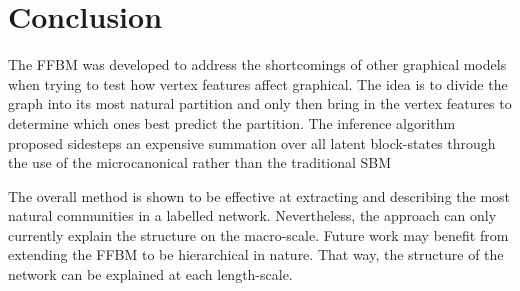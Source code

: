 \section{Conclusion}

The FFBM was developed to address the shortcomings of other graphical models when trying to test how vertex features affect graphical. The idea is to divide the graph into its most natural partition and only then bring in the vertex features to determine which ones best predict the partition. The inference algorithm proposed sidesteps an expensive summation over all latent block-states through the use of the microcanonical rather than the traditional SBM

The overall method is shown to be effective at extracting and describing the most natural communities in a labelled network. Nevertheless, the approach can only currently explain the structure on the macro-scale. Future work may benefit from extending the FFBM to be hierarchical in nature. That way, the structure of the network can be explained at each length-scale.